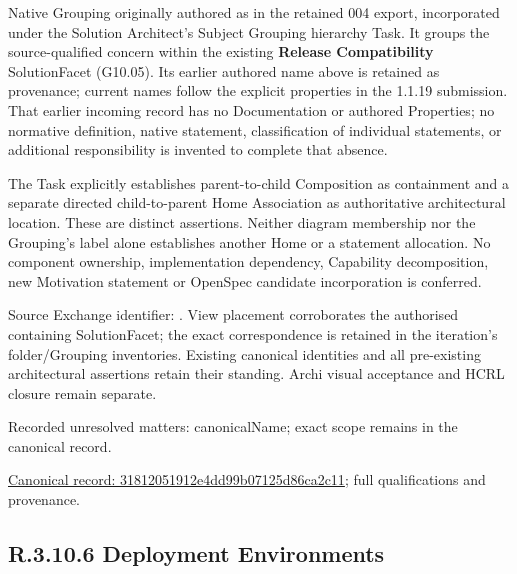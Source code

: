 Native Grouping originally authored as \texttt{} in the retained 004 export,
incorporated under the Solution Architect's Subject Grouping hierarchy Task.
It groups the source-qualified \texttt{} concern within
the existing \textbf{Release Compatibility} SolutionFacet (G10.05). Its earlier authored name above is retained as provenance; current names
follow the explicit properties in the 1.1.19 submission.
That earlier incoming record has no Documentation or authored Properties; no normative
definition, native statement, classification of individual statements, or
additional responsibility is invented to complete that absence.



The Task explicitly establishes parent-to-child Composition as containment and
a separate directed child-to-parent Home Association as authoritative architectural
location. These are distinct assertions. Neither diagram membership nor the
Grouping's label alone establishes another Home or a statement allocation.
No component ownership, implementation dependency, Capability decomposition,
new Motivation statement or OpenSpec candidate incorporation is conferred.



Source Exchange identifier: \texttt{}. View placement corroborates
the authorised containing SolutionFacet; the exact correspondence is retained in the
iteration's folder/Grouping inventories. Existing canonical identities and all
pre-existing architectural assertions retain their standing. Archi visual
acceptance and HCRL closure remain separate.


{\small Recorded unresolved matters: canonicalName; exact scope remains in the canonical record.}\par
{\footnotesize \href{../../../../../../../continuum/grouping/31812051912e4dd99b07125d86ca2c11.md}{Canonical record: 31812051912e4dd99b07125d86ca2c11}; full qualifications and provenance.}\par
\subsection*{R.3.10.6 Deployment Environments}
\label{navigation:R.3.10.6}

